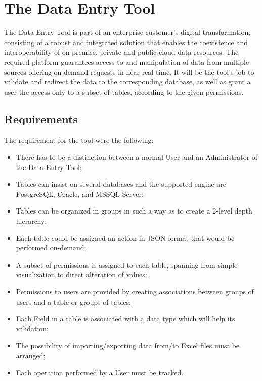 \graphicspath{{images/}}
\chapter{The Data Entry Tool}
The Data Entry Tool is part of an enterprise customer's digital transformation, consisting of a robust and integrated solution that enables the coexistence and interoperability of on-premise, private and public cloud data resources. The required platform guarantees access to and manipulation of data from multiple sources offering on-demand requests in near real-time. It will be the tool's job to validate and redirect the data to the corresponding database, as well as grant a user the access only to a subset of tables, according to the given permissions.

\section{Requirements}
The requirement for the tool were the following:
\begin{itemize}
    \item There has to be a distinction between a normal User and an Administrator of the Data Entry Tool;
    \item Tables can insist on several databases and the supported engine are PostgreSQL, Oracle, and MSSQL Server;
    \item Tables can be organized in groups in such a way as to create a 2-level depth hierarchy;
    \item Each table could be assigned an action in JSON format that would be performed on-demand;
    \item A subset of permissions is assigned to each table, spanning from simple visualization to direct alteration of values;
    \item Permissions to users are provided by creating associations between groups of users and a table or groups of tables;
    \item Each Field in a table is associated with a data type which will help its validation;
    \item The possibility of importing/exporting data from/to Excel files must be arranged;
    \item Each operation performed by a User must be tracked.
\end{itemize}


